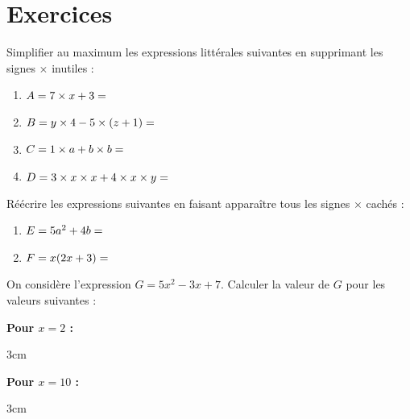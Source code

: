 \documentclass[a4paper]{book}
\begin{document}
\section{Exercices}
    \begin{exercice}
        Simplifier au maximum les expressions littérales suivantes en supprimant les signes $\times$ inutiles :
        \begin{enumerate}[label=\alph*)]
            \item $A = 7 \times x + 3 = \dotfill$
            \item $B = y \times 4 - 5 \times (z + 1) = \dotfill$
            \item $C = 1 \times a + b \times b = \dotfill$
            \item $D = 3 \times x \times x + 4 \times x \times y = \dotfill$
        \end{enumerate}
    \end{exercice}
    
    \begin{exercice}
        Réécrire les expressions suivantes en faisant apparaître tous les signes $\times$ cachés :
        \begin{enumerate}[label=\alph*)]
            \item $E = 5a^2 + 4b = \dotfill$
            \item $F = x(2x + 3) = \dotfill$
        \end{enumerate}
    \end{exercice}
    
    \begin{exercice}
        On considère l'expression $G = 5x^2 - 3x + 7$.
        Calculer la valeur de $G$ pour les valeurs suivantes :
        
        \medskip
        \begin{minipage}{0.48\linewidth}
            \textbf{Pour $x = 2$ :}
            \begin{ZoneReponse}{3cm}\end{ZoneReponse}
        \end{minipage}
        \hfill
        \begin{minipage}{0.48\linewidth}
            \textbf{Pour $x = 10$ :}
            \begin{ZoneReponse}{3cm}\end{ZoneReponse}
        \end{minipage}
    \end{exercice}
    
\end{document}
